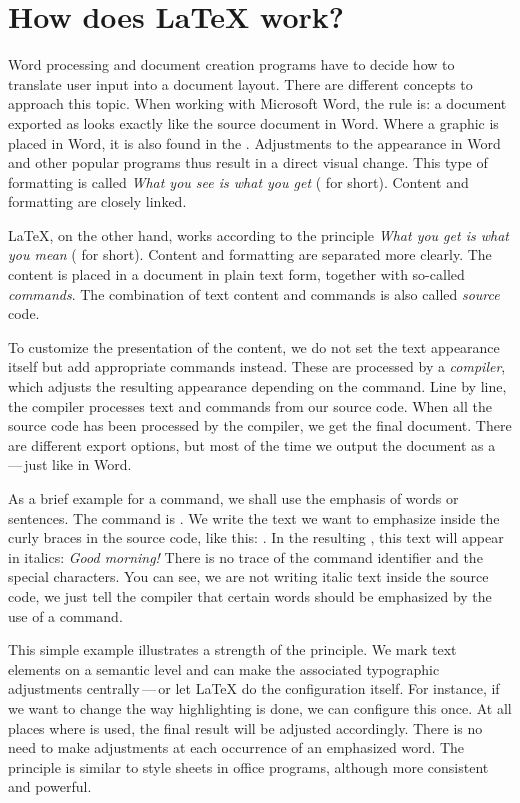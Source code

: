 \chapter{How does \LaTeX{} work?}
\label{sec:basic-functionality}

Word processing and document creation programs have to decide how to translate user input into a document layout.
There are different concepts to approach this topic.
When working with Microsoft Word, the rule is: a document exported as  looks exactly like the source document in Word. 
Where a graphic is placed in Word, it is also found in the . 
Adjustments to the appearance in Word and other popular programs thus result in a direct visual change. 
This type of formatting is called \emph{What you see is what you get} ( for short). 
Content and formatting are closely linked.

\LaTeX{}, on the other hand, works according to the principle \emph{What you get is what you mean} ( for short). 
Content and formatting are separated more clearly.
The content is placed in a document in plain text form, together with so-called \emph{commands}. 
The combination of text content and commands is also called \emph{source} code.

To customize the presentation of the content, we do not set the text appearance itself but add appropriate commands instead. 
These are processed by a \emph{compiler}, which adjusts the resulting appearance depending on the command. 
Line by line, the compiler processes text and commands from our source code. 
When all the source code has been processed by the compiler, we get the final document. 
There are different export options, but most of the time we output the document as a \,---\,just like in Word.

As a brief example for a command, we shall use the emphasis of words or sentences. 
The command is . 
We write the text we want to emphasize inside the curly braces in the source code, like this: 
. 
In the resulting , this text will appear in italics: \emph{Good morning!} 
There is no trace of the command identifier and the special characters. 
You can see, we are not writing italic text inside the source code, we just tell the compiler that certain words should be emphasized by the use of a command.

This simple example illustrates a strength of the  principle. 
We mark text elements on a semantic level and can make the associated typographic adjustments centrally\,---\,or let \LaTeX{} do the configuration itself.
For instance, if we want to change the way highlighting is done, we can configure this once. 
At all places where  is used, the final result will be adjusted accordingly. 
There is no need to make adjustments at each occurrence of an emphasized word. 
The principle is similar to style sheets in office programs, although more consistent and powerful.

